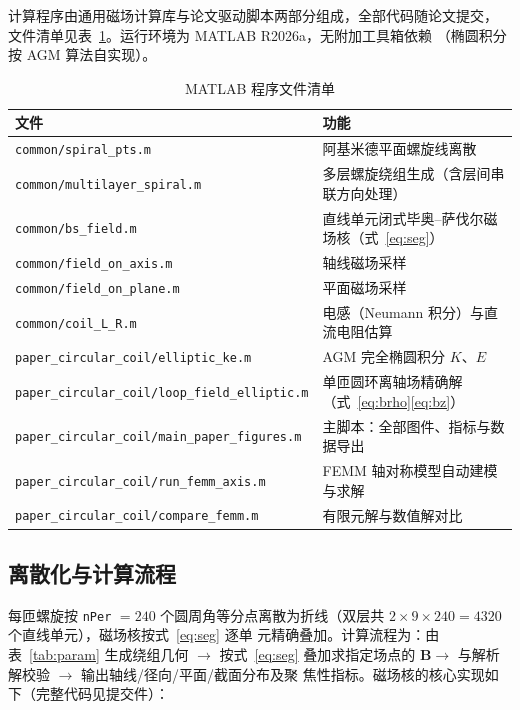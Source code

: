 \documentclass[zihao=-4,a4paper]{ctexart}
\numberwithin{figure}{section}
\numberwithin{table}{section}
\numberwithin{equation}{section}
\begin{document}
计算程序由通用磁场计算库与论文驱动脚本两部分组成，全部代码随论文提交，
文件清单见表~\ref{tab:code}。运行环境为 MATLAB R2026a，无附加工具箱依赖
（椭圆积分按 AGM 算法自实现）。

\begin{table}[htbp]
  \centering
  \caption{MATLAB 程序文件清单}
  \label{tab:code}
  \begin{tabular}{ll}
    \toprule
    文件 & 功能 \\
    \midrule
    \texttt{common/spiral\_pts.m}          & 阿基米德平面螺旋线离散 \\
    \texttt{common/multilayer\_spiral.m}   & 多层螺旋绕组生成（含层间串联方向处理） \\
    \texttt{common/bs\_field.m}            & 直线单元闭式毕奥--萨伐尔磁场核（式~\eqref{eq:seg}） \\
    \texttt{common/field\_on\_axis.m}      & 轴线磁场采样 \\
    \texttt{common/field\_on\_plane.m}     & 平面磁场采样 \\
    \texttt{common/coil\_L\_R.m}           & 电感（Neumann 积分）与直流电阻估算 \\
    \texttt{paper\_circular\_coil/elliptic\_ke.m}       & AGM 完全椭圆积分 $K$、$E$ \\
    \texttt{paper\_circular\_coil/loop\_field\_elliptic.m} & 单匝圆环离轴场精确解（式~\eqref{eq:brho}\eqref{eq:bz}） \\
    \texttt{paper\_circular\_coil/main\_paper\_figures.m}  & 主脚本：全部图件、指标与数据导出 \\
    \texttt{paper\_circular\_coil/run\_femm\_axis.m}       & FEMM 轴对称模型自动建模与求解 \\
    \texttt{paper\_circular\_coil/compare\_femm.m}         & 有限元解与数值解对比 \\
    \bottomrule
  \end{tabular}
\end{table}

\subsection{离散化与计算流程}

每匝螺旋按 \texttt{nPer} $=240$ 个圆周角等分点离散为折线（双层共
$2\times9\times240 = 4320$ 个直线单元），磁场核按式~\eqref{eq:seg} 逐单
元精确叠加。计算流程为：由表~\ref{tab:param} 生成绕组几何 $\rightarrow$
按式~\eqref{eq:seg} 叠加求指定场点的 $\boldsymbol{B}
\rightarrow$ 与解析解校验 $\rightarrow$ 输出轴线/径向/平面/截面分布及聚
焦性指标。磁场核的核心实现如下（完整代码见提交件）：
\end{document}
